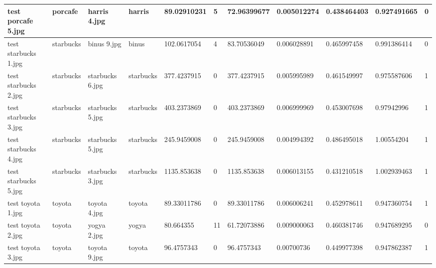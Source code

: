 \begin{landscape}
\begin{longtable}{|p{2cm}|p{1.5cm}|p{2cm}|p{1.5cm}|p{2cm}|p{1cm}|p{2cm}|p{2cm}|p{2cm}|p{2cm}|p{1cm}|}
		test porcafe 5.jpg   & porcafe          & harris 4.jpg          & harris                      & 89.02910231           & 5                       & 72.96399677                & 0.005012274           & 0.438464403           & 0.927491665              & 0                \\ \hline
		test starbucks 1.jpg & starbucks        & binus 9.jpg           & binus                       & 102.0617054           & 4                       & 83.70536049                & 0.006028891           & 0.465997458           & 0.991386414              & 0                \\ \hline
		test starbucks 2.jpg & starbucks        & starbucks 6.jpg       & starbucks                   & 377.4237915           & 0                       & 377.4237915                & 0.005995989           & 0.461549997           & 0.975587606              & 1                \\ \hline
		test starbucks 3.jpg & starbucks        & starbucks 5.jpg       & starbucks                   & 403.2373869           & 0                       & 403.2373869                & 0.006999969           & 0.453007698           & 0.97942996               & 1                \\ \hline
		test starbucks 4.jpg & starbucks        & starbucks 5.jpg       & starbucks                   & 245.9459008           & 0                       & 245.9459008                & 0.004994392           & 0.486495018           & 1.00554204               & 1                \\ \hline
		test starbucks 5.jpg & starbucks        & starbucks 3.jpg       & starbucks                   & 1135.853638           & 0                       & 1135.853638                & 0.006013155           & 0.431210518           & 1.002939463              & 1                \\ \hline
		test toyota 1.jpg    & toyota           & toyota 4.jpg          & toyota                      & 89.33011786           & 0                       & 89.33011786                & 0.006006241           & 0.452978611           & 0.947360754              & 1                \\ \hline
		test toyota 2.jpg    & toyota           & yogya 2.jpg           & yogya                       & 80.664355             & 11                      & 61.72073886                & 0.009000063           & 0.460381746           & 0.947689295              & 0                \\ \hline
		test toyota 3.jpg    & toyota           & toyota 9.jpg          & toyota                      & 96.4757343            & 0                       & 96.4757343                 & 0.00700736            & 0.449977398           & 0.947862387              & 1                \\ \hline

\end{longtable}
\end{landscape}
